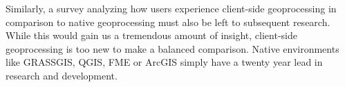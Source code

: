 
Similarly, a survey analyzing how users experience client-side geoprocessing in comparison to native geoprocessing must also be left to subsequent research. While this would gain us a tremendous amount of insight, client-side geoprocessing is too new to make a balanced comparison. Native environments like GRASSGIS, QGIS, FME or ArcGIS simply have a twenty year lead in research and development. 



